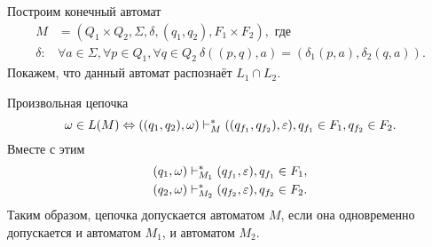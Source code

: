 Построим конечный автомат
\begin{align*}
M &= (Q_1 \times Q_2,\Sigma, \delta, (q_1, q_2), F_1 \times F_2),\text{ где}\\
\delta:& \forall a \in \Sigma, \forall p \in Q_1, \forall q \in Q_2 \: \delta((p, q), a) = (\delta_1(p,a), \delta_2(q,a)).
\end{align*}
Покажем, что данный автомат распознаёт $L_1 \cap L_2$.

Произвольная цепочка
\[\omega \in L(M) 
    \Leftrightarrow 
    ((q_1, q_2), \omega) \vdash_{M}^* ((q_{f_1}, q_{f_2}), \varepsilon), q_{f_1} \in F_1, q_{f_2} \in F_2.\] 
Вместе с этим 
\begin{align*}
  (q_1, \omega) &\vdash_{M_1}^* (q_{f_1}, \varepsilon),  q_{f_1} \in F_1, \\
  (q_2, \omega) &\vdash_{M_2}^* (q_{f_2}, \varepsilon), q_{f_2} \in F_2.
\end{align*}
Таким образом, цепочка допускается автоматом $M$, если она одновременно допускается и автоматом $M_1$, и автоматом $M_2$.

